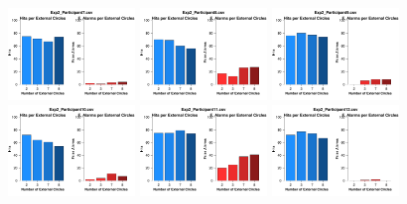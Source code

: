 \begin{figure}[th]
\includegraphics[width=0.30\textwidth]{Figures/Numero_Exp2_P7} \includegraphics[width=0.30\textwidth]{Figures/Numero_Exp2_P8} \includegraphics[width=0.30\textwidth]{Figures/Numero_Exp2_P9}
\includegraphics[width=0.30\textwidth]{Figures/Numero_Exp2_P10} \includegraphics[width=0.30\textwidth]{Figures/Numero_Exp2_P11} \includegraphics[width=0.30\textwidth]{Figures/Numero_Exp2_P12}

\end{figure}
